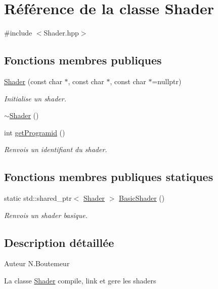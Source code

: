 \hypertarget{classShader}{\section{Référence de la classe Shader}
\label{classShader}
}


{\ttfamily \#include $<$Shader.\+hpp$>$}

\subsection*{Fonctions membres publiques}
\begin{DoxyCompactItemize}
\item 
\hyperlink{classShader_afafdbb306a177ca17d3ef81c30baacd3}{Shader} (const char $\ast$, const char $\ast$, const char $\ast$=nullptr)
\begin{DoxyCompactList}\small\item\em Initialise un shader. \end{DoxyCompactList}\item 
\hyperlink{classShader_aff01df87e8a102f270b5b135a295e59d}{$\sim$\+Shader} ()
\item 
int \hyperlink{classShader_a5aefd32ef08fd4da700b0bb2b75aeaf9}{get\+Programid} ()
\begin{DoxyCompactList}\small\item\em Renvois un identifiant du shader. \end{DoxyCompactList}\end{DoxyCompactItemize}
\subsection*{Fonctions membres publiques statiques}
\begin{DoxyCompactItemize}
\item 
static std\+::shared\+\_\+ptr$<$ \hyperlink{classShader}{Shader} $>$ \hyperlink{classShader_a4271c98d9ced209f007acde7a99496d1}{Basic\+Shader} ()
\begin{DoxyCompactList}\small\item\em Renvois un shader basique. \end{DoxyCompactList}\end{DoxyCompactItemize}


\subsection{Description détaillée}
\begin{DoxyAuthor}{Auteur}
N.\+Boutemeur
\end{DoxyAuthor}
La classe \hyperlink{classShader}{Shader} compile, link et gere les shaders 

